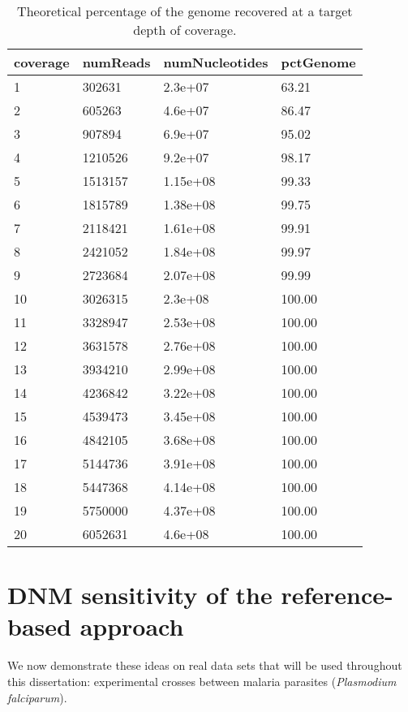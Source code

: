 \begin{table}[]
\centering
\caption{Theoretical percentage of the genome recovered at a target depth of coverage.}
\label{tb:lw_cov}

\begin{tabular}{llll}
\toprule
coverage & numReads & numNucleotides & pctGenome\\
\midrule
1 & 302631 & 2.3e+07 & 63.21\\
2 & 605263 & 4.6e+07 & 86.47\\
3 & 907894 & 6.9e+07 & 95.02\\
4 & 1210526 & 9.2e+07 & 98.17\\
5 & 1513157 & 1.15e+08 & 99.33\\
6 & 1815789 & 1.38e+08 & 99.75\\
7 & 2118421 & 1.61e+08 & 99.91\\
8 & 2421052 & 1.84e+08 & 99.97\\
9 & 2723684 & 2.07e+08 & 99.99\\
10 & 3026315 & 2.3e+08 & 100.00\\
11 & 3328947 & 2.53e+08 & 100.00\\
12 & 3631578 & 2.76e+08 & 100.00\\
13 & 3934210 & 2.99e+08 & 100.00\\
14 & 4236842 & 3.22e+08 & 100.00\\
15 & 4539473 & 3.45e+08 & 100.00\\
16 & 4842105 & 3.68e+08 & 100.00\\
17 & 5144736 & 3.91e+08 & 100.00\\
18 & 5447368 & 4.14e+08 & 100.00\\
19 & 5750000 & 4.37e+08 & 100.00\\
20 & 6052631 & 4.6e+08 & 100.00\\
\bottomrule
\end{tabular}


\end{table}

\section{DNM sensitivity of the reference-based approach}

We now demonstrate these ideas on real data sets that will be used throughout this dissertation: experimental crosses between malaria parasites (\textit{Plasmodium falciparum}). %

